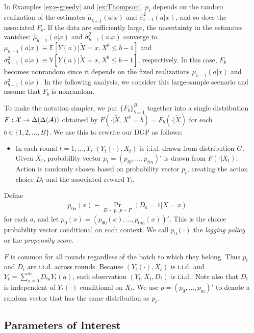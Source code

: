\documentclass[letterpaper]{article} \usepackage{aaai19}  \usepackage{times}  \usepackage{helvet}  \usepackage{courier}  \usepackage{url}  \usepackage{graphicx}  \frenchspacing  \usepackage{comment}
\begin{document}
In Examples \ref{ex:e-greedy} and \ref{ex:Thompson}, $p_t$ depends on the random realization of the estimates $\hat \mu_{b-1}(a|x)$ and $\hat \sigma^2_{b-1}(a|x)$, and so does the associated $F_b$.
If the data are sufficiently large, the uncertainty in the estimates vanishes: $\hat \mu_{b-1}(a|x)$ and $\hat \sigma^2_{b-1}(a|x)$ converge to $\mu_{b-1}(a|x)\equiv\mathbb E[Y(a)|\tilde X=x,X^b\le b-1]$ and $\sigma^2_{b-1}(a|x)\equiv\mathbb V[Y(a)|\tilde X=x,X^b\le b-1]$, respectively. 
In this case, $F_b$ becomes nonrandom since it depends on the fixed realizations $\mu_{b-1}(a|x)$ and $\sigma^2_{b-1}(a|x)$.
In the following analysis, we consider this large-sample scenario and assume that $F_b$ is nonrandom.


To make the notation simpler, we put $\{F_b\}_{b=1}^B$ together into a single distribution $F: {\cal X}\rightarrow \Delta(\Delta({\cal A}))$ obtained by $F(\cdot|\tilde X, X^b=b)=F_b(\cdot|\tilde X)$ for each $b\in\{1,2,...,B\}$.
We use this to rewrite our DGP as follows:

\begin{itemize}
	\item In each round $t=1,...,T$, $(Y_t(\cdot),X_t)$ is i.i.d. drawn from distribution $G$.
	Given $X_t$, probability vector $p_t=(p_{t0},...,p_{tm})'$ is drawn from $F(\cdot|X_t)$. 
	Action is randomly chosen based on probability vector $p_t$, creating the action choice $D_{t}$ and the associated reward $Y_t$. 
\end{itemize}

Define
\begin{align*}
p_{0a}(x)\equiv\Pr_{D\sim p, ~p\sim F}(D_{a}=1|X=x)
\end{align*}
for each $a$, and let $p_0(x)=(p_{00}(x),...,p_{0m}(x))'$.
This is the choice probability vector conditional on each context.
We call $p_0(\cdot)$ the {\it logging policy} or the {\it propensity score}.

$F$ is common for all rounds regardless of the batch to which they belong. 
Thus $p_t$ and $D_t$ are i.i.d. across rounds.
Because $(Y_t(\cdot),X_t)$ is i.i.d. and $Y_t=\sum_{a=0}^m D_{ta}Y_t(a)$, each observation $(Y_t,X_t,D_t)$ is i.i.d..
Note also that $D_t$ is independent of $Y_t(\cdot)$ conditional on $X_t$.
We use $p=(p_0,...,p_m)'$ to denote a random vector that has the same distribution as $p_{t}$.



\subsection{Parameters of Interest}
\end{document}
